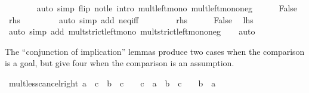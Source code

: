 \begin{isabellebody}
\ \ \ \ \ \ \isamarkupfalse%
\ {\isacharparenleft}{\kern0pt}auto\ simp\ flip{\isacharcolon}{\kern0pt}\ not{\isacharunderscore}{\kern0pt}le\ intro{\isacharcolon}{\kern0pt}\ mult{\isacharunderscore}{\kern0pt}left{\isacharunderscore}{\kern0pt}mono\ mult{\isacharunderscore}{\kern0pt}left{\isacharunderscore}{\kern0pt}mono{\isacharunderscore}{\kern0pt}neg{\isacharparenright}{\kern0pt}\isanewline
\ \ \ \ \isamarkupfalse%
\ False\ \isamarkupfalse%
\ {\isacharquery}{\kern0pt}rhs\ \isanewline
\ \ \ \ \ \ \isamarkupfalse%
\ {\isacharparenleft}{\kern0pt}auto\ simp\ add{\isacharcolon}{\kern0pt}\ neq{\isacharunderscore}{\kern0pt}iff{\isacharparenright}{\kern0pt}\isanewline
\ \ \isamarkupfalse%
\isanewline
\ \ \ \ \isamarkupfalse%
\ {\isacharquery}{\kern0pt}rhs\isanewline
\ \ \ \ \isamarkupfalse%
\ False\ \isamarkupfalse%
\ {\isacharquery}{\kern0pt}lhs\ \isanewline
\ \ \ \ \ \ \isamarkupfalse%
\ {\isacharparenleft}{\kern0pt}auto\ simp\ add{\isacharcolon}{\kern0pt}\ mult{\isacharunderscore}{\kern0pt}strict{\isacharunderscore}{\kern0pt}left{\isacharunderscore}{\kern0pt}mono\ mult{\isacharunderscore}{\kern0pt}strict{\isacharunderscore}{\kern0pt}left{\isacharunderscore}{\kern0pt}mono{\isacharunderscore}{\kern0pt}neg{\isacharparenright}{\kern0pt}\isanewline
\ \ \isamarkupfalse%
\isanewline
{}\isamarkupfalse%
\ auto%
\endisatagproof
{\isafoldproof}%
%
\isadelimproof
%
\endisadelimproof
%
\begin{isamarkuptext}%
The ``conjunction of implication'' lemmas produce two cases when the
  comparison is a goal, but give four when the comparison is an assumption.%
\end{isamarkuptext}\isamarkuptrue%
\isamarkupfalse%
\ mult{\isacharunderscore}{\kern0pt}less{\isacharunderscore}{\kern0pt}cancel{\isacharunderscore}{\kern0pt}right{\isacharcolon}{\kern0pt}\ {\isachardoublequoteopen}a\ {\isacharasterisk}{\kern0pt}\ c\ {\isacharless}{\kern0pt}\ b\ {\isacharasterisk}{\kern0pt}\ c\ {\isasymlongleftrightarrow}\ {\isacharparenleft}{\kern0pt}{}\ {\isasymle}\ c\ {\isasymlongrightarrow}\ a\ {\isacharless}{\kern0pt}\ b{\isacharparenright}{\kern0pt}\ {\isasymand}\ {\isacharparenleft}{\kern0pt}c\ {\isasymle}\ {}\ {\isasymlongrightarrow}\ b\ {\isacharless}{\kern0pt}\ a{\isacharparenright}{\kern0pt}{\isachardoublequoteclose}\isanewline
%
\isadelimproof
\ \ %
\endisadelimproof
%
\isatagproof
{}\isamarkupfalse%

\end{isabellebody}
